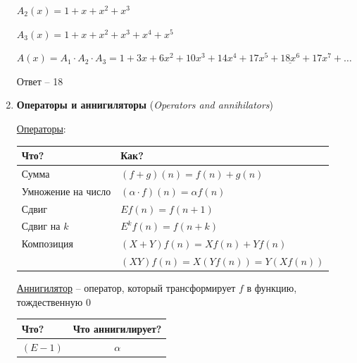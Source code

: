 \documentclass[12pt]{article}
\begin{document}
\begin{enumerate}
        $A_2(x) = 1 + x + x^2 + x^3$

        $A_3(x) = 1 + x + x^2 + x^3 + x^4 + x^5$

        $A(x) = A_1 \cdot A_2 \cdot A_3 = 1 + 3x + 6x^2 + 10x^3 + 14x^4 + 17x^5 + \underline{18x^6} + 17x^7 + \dots$

        Ответ -- 18

        \item \textbf{Операторы и аннигиляторы} (\textit{Operators and annihilators})

        \hyperlink{operators}{Операторы}:

        \begin{tabular}{ll}
            \hline

            \hfil Что? & \hfil Как? \\

            \hline

            Сумма & $(f + g)(n) = f(n) + g(n)$ \\

            \hline

            Умножение на число & $(\alpha \cdot f)(n) = \alpha f(n)$ \\

            \hline

            Сдвиг & $E f(n) = f(n + 1)$ \\

            \hline

            Сдвиг на $k$ & $E^k f(n) = f(n + k)$ \\

            \hline

            Композиция & $(X + Y) f(n) = Xf(n) + Yf(n)$ \\

             & $(XY) f(n) = X(Yf(n)) = Y(Xf(n))$ \\

        \end{tabular}

        \hyperlink{annihilator}{Аннигилятор} -- оператор, который трансформирует $f$ в функцию, тождественную $0$

        
        \begin{tabular}{lc}
            \hline

            \hfil Что? & Что аннигилирует? \\

            \hline

            $(E - 1)$ & $\alpha$ \\


\end{tabular}
\end{enumerate}
\end{document}
